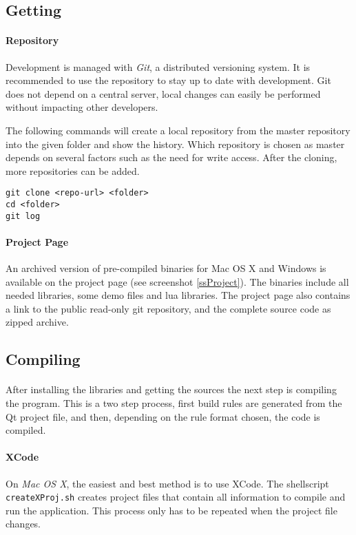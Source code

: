 \subsection{Getting \ER}
\paragraph{Repository}
Development is managed with \textit{Git}\cite{git}, a distributed versioning system.
It is recommended to use the repository to stay up to date with development.
Git does not depend on a central server, local changes can easily be performed without impacting other developers.

The following commands will create a local repository from the master repository into the given folder and show the history.
Which repository is chosen as master depends on several factors such as the need for write access.
After the cloning, more repositories can be added.

\begin{verbatim}
git clone <repo-url> <folder>
cd <folder>
git log
\end{verbatim}

\paragraph{Project Page}
An archived version of pre-compiled binaries for Mac OS X and Windows is available on the project page\cite{project} (see screenshot \ref{ssProject}).
The binaries include all needed libraries, some demo files and lua libraries.
The project page also contains a link to the public read-only git repository, and the complete source code as zipped archive.


\subsection{Compiling}
\paragraph{}
After installing the libraries and getting the sources the next step is compiling the program.
This is a two step process, first build rules are generated from the Qt project file, and then, depending on the rule format chosen, the code is compiled.

\paragraph{XCode}
On \textit{Mac OS X}, the easiest and best method is to use XCode.
The shellscript \texttt{createXProj.sh} creates project files that contain all information to compile and run the application.
This process only has to be repeated when the project file changes.

